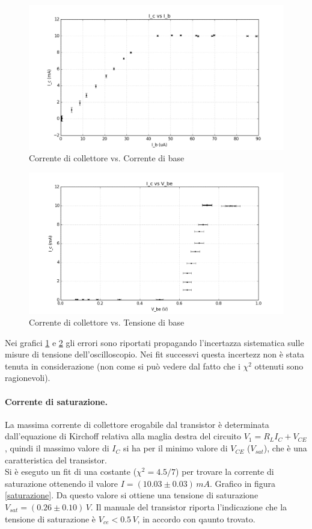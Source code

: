 \documentclass[10pt,a4paper]{article}
\begin{document}
\begin{figure}[!htb]
  \centering
  \includegraphics[scale=0.5]{IcIb.png} 
\caption{Corrente di collettore vs. Corrente di base}  \label{IcIb}
\end{figure}

\begin{figure}[!htb]
  \centering
  \includegraphics[scale=0.5]{IcVbe.png} 
\caption{Corrente di collettore vs. Tensione di base}  \label{IcVbe}
\end{figure}

Nei grafici \ref{IcIb} e \ref{IcVbe} gli errori sono riportati propagando l'incertazza sistematica sulle misure di tensione dell'oscilloscopio. Nei fit successvi questa incertezz non è stata tenuta in considerazione (non come si può vedere dal fatto che i $\chi^2$ ottenuti sono ragionevoli).


\paragraph{Corrente di saturazione.}
La massima corrente di collettore erogabile dal transistor è determinata dall'equazione di Kirchoff relativa alla maglia destra del circuito  $V_1 = R_LI_C + V_{CE}$, quindi il massimo valore di $I_C$ si ha per il minimo valore di $V_{CE}$ ($V_{sat}$), che è una caratteristica del transistor.\\
Si è eseguto un fit di una costante ($\chi^2 = 4.5/7$) per trovare la corrente di saturazione ottenendo il valore $I = (10.03 \pm 0.03) \, mA$. Grafico in figura \ref{saturazione}. Da questo valore si ottiene una tensione di saturazione $V_{sat} = (0.26 \pm 0.10) \, V$. Il manuale del transistor riporta l'indicazione che la tensione di saturazione è $V_{ce} < 0.5 \, V$, in accordo con qaunto trovato.
\end{document}
